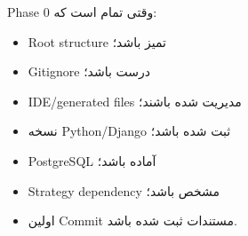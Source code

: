 \begin{donebox}
Phase 0 وقتی تمام است که:
\begin{itemize}
  \item Root structure تمیز باشد؛
  \item Gitignore درست باشد؛
  \item IDE/generated files مدیریت شده باشند؛
  \item نسخه Python/Django ثبت شده باشد؛
  \item PostgreSQL آماده باشد؛
  \item Strategy dependency مشخص باشد؛
  \item اولین Commit مستندات ثبت شده باشد.
\end{itemize}
\end{donebox}
